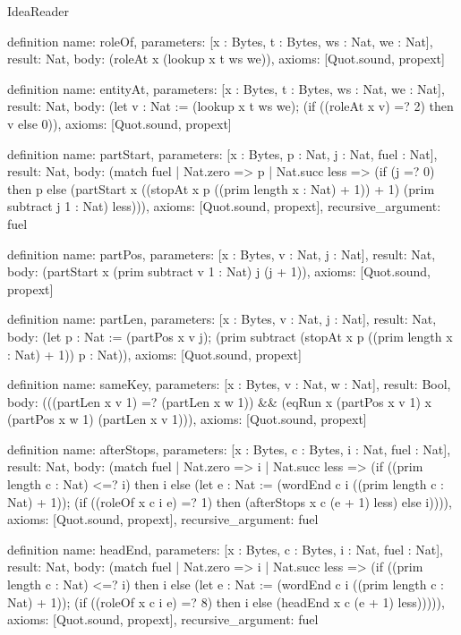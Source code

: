 \begin{lexlean}{IdeaReader}
\begin{semanticmodule}
definition{
  name: roleOf,
  parameters: [x : Bytes, t : Bytes, ws : Nat, we : Nat],
  result: Nat,
  body: (roleAt x (lookup x t ws we)),
  axioms: [Quot.sound, propext]
}

definition{
  name: entityAt,
  parameters: [x : Bytes, t : Bytes, ws : Nat, we : Nat],
  result: Nat,
  body: (let v : Nat := (lookup x t ws we); (if ((roleAt x v) =? 2) then v else 0)),
  axioms: [Quot.sound, propext]
}

definition{
  name: partStart,
  parameters: [x : Bytes, p : Nat, j : Nat, fuel : Nat],
  result: Nat,
  body: (match fuel
    | Nat.zero => p
    | Nat.succ less => (if (j =? 0) then p else (partStart x ((stopAt x p ((prim length x : Nat) + 1)) + 1) (prim subtract j 1 : Nat) less))),
  axioms: [Quot.sound, propext],
  recursive_argument: fuel
}

definition{
  name: partPos,
  parameters: [x : Bytes, v : Nat, j : Nat],
  result: Nat,
  body: (partStart x (prim subtract v 1 : Nat) j (j + 1)),
  axioms: [Quot.sound, propext]
}

definition{
  name: partLen,
  parameters: [x : Bytes, v : Nat, j : Nat],
  result: Nat,
  body: (let p : Nat := (partPos x v j); (prim subtract (stopAt x p ((prim length x : Nat) + 1)) p : Nat)),
  axioms: [Quot.sound, propext]
}

definition{
  name: sameKey,
  parameters: [x : Bytes, v : Nat, w : Nat],
  result: Bool,
  body: (((partLen x v 1) =? (partLen x w 1)) && (eqRun x (partPos x v 1) x (partPos x w 1) (partLen x v 1))),
  axioms: [Quot.sound, propext]
}

definition{
  name: afterStops,
  parameters: [x : Bytes, c : Bytes, i : Nat, fuel : Nat],
  result: Nat,
  body: (match fuel
    | Nat.zero => i
    | Nat.succ less => (if ((prim length c : Nat) <=? i) then i else (let e : Nat := (wordEnd c i ((prim length c : Nat) + 1)); (if ((roleOf x c i e) =? 1) then (afterStops x c (e + 1) less) else i)))),
  axioms: [Quot.sound, propext],
  recursive_argument: fuel
}

definition{
  name: headEnd,
  parameters: [x : Bytes, c : Bytes, i : Nat, fuel : Nat],
  result: Nat,
  body: (match fuel
    | Nat.zero => i
    | Nat.succ less => (if ((prim length c : Nat) <=? i) then i else (let e : Nat := (wordEnd c i ((prim length c : Nat) + 1)); (if ((roleOf x c i e) =? 8) then i else (headEnd x c (e + 1) less))))),
  axioms: [Quot.sound, propext],
  recursive_argument: fuel
}


\end{semanticmodule}
\end{lexlean}
